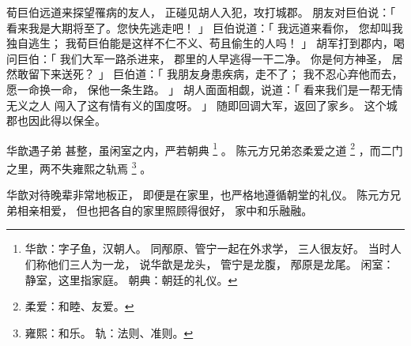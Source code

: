 \begin{paracol}{2}
\switchcolumn

荀巨伯远道来探望罹病的友人，
正碰见胡人入犯，攻打城郡。
朋友对巨伯说：「
    看来我是大期将至了。您快先逃走吧！
」
巨伯说道：「
    我远道来看你，
    您却叫我独自逃生；
    我荀巨伯能是这样不仁不义、苟且偷生的人吗！
」
胡军打到郡内，喝问巨伯：「
    我们大军一路杀进来，
    郡里的人早逃得一干二净。
    你是何方神圣，
    居然敢留下来送死？
」
巨伯道：「
    我朋友身患疾病，走不了；
    我不忍心弃他而去，
    愿一命换一命，
    保他一条生路。
」
胡人面面相觑，说道：「
    看来我们是一帮无情无义之人
    闯入了这有情有义的国度呀。
」
随即回调大军，返回了家乡。
这个城郡也因此得以保全。


\switchcolumn*[\section{}]

华歆遇子弟
甚整，虽闲室之内，严若朝典%
\footnote{%
    华歆：字子鱼，汉朝人。
          同邴原、管宁一起在外求学，
          三人很友好。
          当时人们称他们三人为一龙，
          说华歆是龙头，
          管宁是龙腹，
          邴原是龙尾。
    闲室：静室，这里指家庭。
    朝典：朝廷的礼仪。
}%
。
陈元方兄弟恣柔爱之道%
\footnote{%
    柔爱：和睦、友爱。
}%
，而二门之里，两不失雍熙之轨焉%
\footnote{%
    雍熙：和乐。
    轨：法则、准则。
}%
。

\switchcolumn

华歆对待晚辈非常地板正，
即便是在家里，也严格地遵循朝堂的礼仪。
陈元方兄弟相亲相爱，
但也把各自的家里照顾得很好，
家中和乐融融。

\end{paracol}


